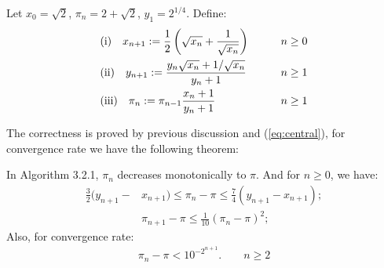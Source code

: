 \documentclass{report}
\begin{document}
\begin{titlepage}
\begin{algorithm}
Let $x_0=\sqrt2$, $\pi_n=2+\sqrt2$, $y_1=2^{1/4}$. Define:
\begin{align*}
&{\rm(i)}\quad x_{n+1}:=\frac{1}{2}\left(\sqrt{x_n}+\frac{1}{\sqrt{x_n}}\right)\qquad &n\ge 0&\\
&{\rm(ii)}\quad y_{n+1}:=\frac{y_n\sqrt{x_n}+1/\sqrt{x_{n}}}{y_n+1}\qquad &n\ge 1&\\
&{\rm(iii)}\quad \pi_n:=\pi_{n-1}\frac{x_n +1}{y_n+1}\qquad &n\ge 1&
\end{align*}
\end{algorithm}
The correctness is proved by previous discussion and (\ref {eq:central}), for convergence rate we have the following theorem:
\begin{T}\label{thm:goal}{\rm\cite{Borwein:1987aa}}
In Algorithm 3.2.1, $\pi_n$ decreases monotonically to $\pi$. And for $n\ge0$, we have:
\begin{align}
\frac{3}{2}(y_{n+1}-&x_{n+1})\le\pi_n-\pi\le\frac{7}{4}(y_{n+1}-x_{n+1});
\label{eq:bound 1}\\
&\pi_{n+1}-\pi\le\frac{1}{10}(\pi_n-\pi)^2\label{eq:bound 2};
\end{align}
Also, for convergence rate:
\begin{align}
\pi_n-\pi<10^{-2^{n+1}}.\qquad n\ge2\label{eq:bound 3}
\end{align}
\end{T}\bigskip


\end{titlepage}
\end{document}
